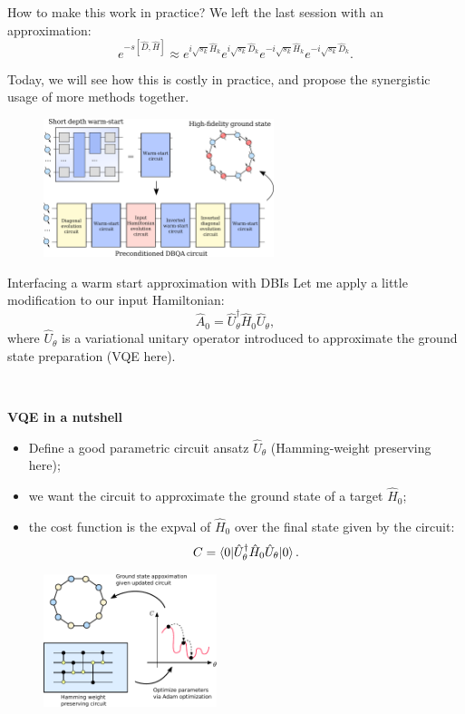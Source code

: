 \documentclass[aspectratio=169, 8pt, xcolor={svgnames}]{beamer}
\begin{document}
\begin{frame}{How to make this work in practice?}
We left the last session with an approximation:
$$ e^{- s [\hat{D}, \hat{H}]} \approx e^{i \sqrt{s_k}\hat{H}_k} 
e^{i \sqrt{s_k}\hat{D}_k} e^{-i \sqrt{s_k}\hat{H}_k} e^{-i \sqrt{s_k}\hat{D}_k}.$$

Today, we will see how this is costly in practice, and propose the synergistic usage of 
more methods together.
\begin{figure}
   \includegraphics[width=0.6\textwidth]{figures/diagram.png}
\end{figure}
\end{frame}

\begin{frame}{Interfacing a warm start approximation with DBIs}
Let me apply a little modification to our input Hamiltonian:
$$ \hat{A}_0 = \hat{U}_{\theta}^{\dagger} \hat{H}_0 \hat{U}_{\theta}, $$
where $\hat{U}_{\theta}$ is a variational unitary operator introduced to approximate 
the ground state preparation (VQE here).
\begin{multicols}{2}
\vspace{1cm}
\texttt{  }

\textbf{VQE in a nutshell}
\begin{itemize}[noitemsep]
\item[1.] Define a good parametric circuit ansatz $\hat{U}_{\theta}$ (Hamming-weight preserving here);
\item[2.] we want the circuit to approximate the ground state of a target $\hat{H}_0$;
\item[3.] the cost function is the expval of $\hat{H}_0$ over the 
final state given by the circuit:
$$ C = \braket{0 | \hat{U}_{\theta}^{\dagger} \hat{H}_0  \hat{U}_{\theta} | 0}.$$
\end{itemize}
\begin{figure}
   \includegraphics[width=0.45\textwidth]{figures/vqe_hw.pdf}
\end{figure}
\end{multicols}
\end{frame}
\end{document}
